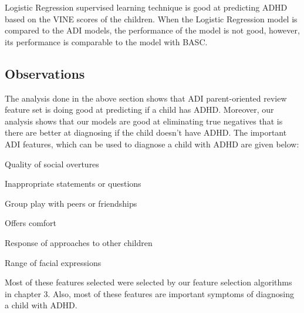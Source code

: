 Logistic Regression supervised learning technique is good at predicting ADHD based on the VINE scores of the children. When the Logistic Regression model is compared to the ADI models, the performance of the model is not good, however, its performance is comparable to the model with BASC.
\subsection{Observations}
The analysis done in the above section shows that ADI parent-oriented review feature set is doing good at predicting if a child has ADHD. Moreover, our analysis shows that our models are good at eliminating true negatives that is there are better at diagnosing if the child doesn't have ADHD. The important ADI features, which can be used to diagnose a child with ADHD are given below:

\begin{compactenum}
\item Quality of social overtures
\item Inappropriate statements or questions
\item Group play with peers or friendships
\item Offers comfort
\item Response of approaches to other children
\item Range of facial expressions
\end{compactenum}

Most of these features selected were selected by our feature selection algorithms in chapter 3. Also, most of these features are important symptoms of diagnosing a child with ADHD.


